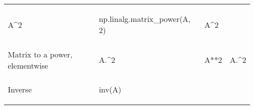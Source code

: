 \documentclass[10pt, landscape]{article}
\newenvironment{Shaded}{}{}
\newcommand{\DecValTok}[1]{\textcolor[rgb]{0.25,0.63,0.44}{{#1}}}
\newcommand{\FloatTok}[1]{\textcolor[rgb]{0.25,0.63,0.44}{{#1}}}
\newcommand{\OperatorTok}[1]{\textcolor[rgb]{0.40,0.40,0.40}{{#1}}}
\newcommand{\NormalTok}[1]{{#1}}
\begin{document}
\begin{multicols*}{2}
\begin{tabular}[ ]{@{}llll@{}}
\begin{minipage}[t]{0.22\columnwidth}
\begin{Shaded}
\begin{Highlighting}[]
\NormalTok{A^}\FloatTok{2}
\end{Highlighting}
\end{Shaded}
\strut
\end{minipage} & \begin{minipage}[t]{0.23\columnwidth}\raggedright\strut
\begin{Shaded}
\begin{Highlighting}[]
\NormalTok{np.linalg.matrix_power(A, }\DecValTok{2}\NormalTok{)}
\end{Highlighting}
\end{Shaded}
\strut
\end{minipage} & \begin{minipage}[t]{0.20\columnwidth}\raggedright\strut
\begin{Shaded}
\begin{Highlighting}[]
\NormalTok{A^}\FloatTok{2}
\end{Highlighting}
\end{Shaded}
\strut
\end{minipage}\tabularnewline
\begin{minipage}[t]{0.23\columnwidth}\raggedright\strut
Matrix to a power, elementwise\strut
\end{minipage} & \begin{minipage}[t]{0.22\columnwidth}\raggedright\strut
\begin{Shaded}
\begin{Highlighting}[]
\NormalTok{A.^}\FloatTok{2}
\end{Highlighting}
\end{Shaded}
\strut
\end{minipage} & \begin{minipage}[t]{0.23\columnwidth}\raggedright\strut
\begin{Shaded}
\begin{Highlighting}[]
\NormalTok{A}\OperatorTok{**}\DecValTok{2}
\end{Highlighting}
\end{Shaded}
\strut
\end{minipage} & \begin{minipage}[t]{0.20\columnwidth}\raggedright\strut
\begin{Shaded}
\begin{Highlighting}[]
\NormalTok{A.^}\FloatTok{2}
\end{Highlighting}
\end{Shaded}
\strut
\end{minipage}\tabularnewline
\begin{minipage}[t]{0.23\columnwidth}\raggedright\strut
Inverse\strut
\end{minipage} & \begin{minipage}[t]{0.22\columnwidth}\raggedright\strut
\begin{Shaded}
\begin{Highlighting}[]
\NormalTok{inv(A)}
\end{Highlighting}
\end{Shaded}


\end{minipage}
\end{tabular}
\end{multicols*}
\end{document}
